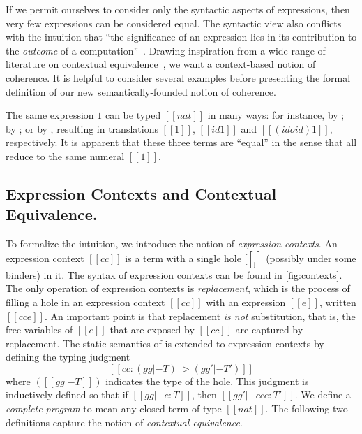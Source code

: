 If we permit ourselves to consider only the syntactic aspects of expressions,
then very few expressions can be considered equal. The syntactic view also conflicts
with the intuition that ``the significance of an expression lies in its
contribution to the \textit{outcome} of a computation''~\citep{Harper_2016}.
Drawing inspiration from a wide range of literature on contextual
equivalence~\citep{morris1969lambda}, we want a context-based notion of
coherence. It is helpful to consider several examples before presenting the
formal definition of our new semantically-founded notion of coherence.

\begin{example} \label{eg:1}
The same \namee expression $1$ can be typed $[[nat]]$ in many ways: for instance, by ; by
; or by , resulting in translations
$[[1]]$, $[[id 1]]$ and $[[ (id o id) 1 ]]$, respectively. It is apparent
that these three \tname terms are ``equal'' in the sense that all reduce to the same numeral $[[1]]$.
\end{example}

\subsection{Expression Contexts and Contextual Equivalence.}

To formalize the intuition, we introduce the notion of \textit{expression
  contexts}. An expression context $[[cc]]$ is a term with a single hole
$[[__]]$ (possibly under some binders) in it. The syntax of \tname expression
contexts can be found in \cref{fig:contexts}. The only operation of expression
contexts is \textit{replacement}, which is the process of filling a hole in an
expression context $[[cc]]$ with an expression $[[e]]$, written $[[ cc{e} ]]$.
An important point is that replacement \textit{is not} substitution, that
is, the free variables of $[[e]]$ that are exposed by $[[cc]]$ are captured by
replacement. The static semantics of \tname is extended to expression contexts
by defining the typing judgment
\[
  [[cc : (gg |- T) ~> (gg' |- T')]]
\]
where $([[gg |- T]])$ indicates the type of the hole. This judgment is
inductively defined so that if $[[gg |- e : T]]$, then $[[gg' |- cc{e} : T']]$.
We define a \textit{complete program} to mean any closed term of type $[[nat]]$.
The following two definitions capture
the notion of \textit{contextual equivalence}.

